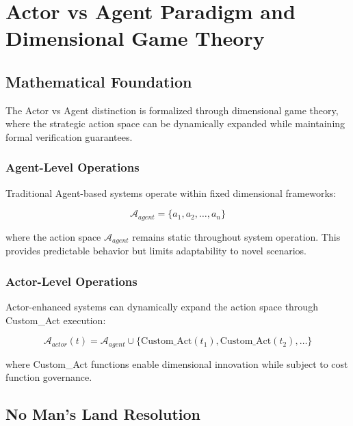 \documentclass[12pt,a4paper]{article}
\begin{document}
\clearpage

\section{Actor vs Agent Paradigm and Dimensional Game Theory}

\subsection{Mathematical Foundation}

The Actor vs Agent distinction is formalized through dimensional game theory, where the strategic action space can be dynamically expanded while maintaining formal verification guarantees.

\subsubsection{Agent-Level Operations}

Traditional Agent-based systems operate within fixed dimensional frameworks:

\begin{equation}
\mathcal{A}_{agent} = \{a_1, a_2, \ldots, a_n\}
\end{equation}

where the action space $\mathcal{A}_{agent}$ remains static throughout system operation. This provides predictable behavior but limits adaptability to novel scenarios.

\subsubsection{Actor-Level Operations}

Actor-enhanced systems can dynamically expand the action space through Custom\_Act execution:

\begin{equation}
\mathcal{A}_{actor}(t) = \mathcal{A}_{agent} \cup \{\text{Custom\_Act}(t_1), \text{Custom\_Act}(t_2), \ldots\}
\end{equation}

where Custom\_Act functions enable dimensional innovation while subject to cost function governance.

\subsection{No Man's Land Resolution}
\end{document}
